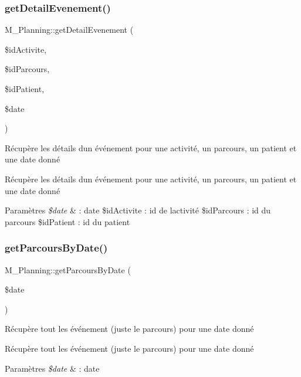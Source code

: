 \subsubsection{\texorpdfstring{get\+Detail\+Evenement()}{getDetailEvenement()}}
{\footnotesize\ttfamily M\+\_\+\+Planning\+::get\+Detail\+Evenement (\begin{DoxyParamCaption}\item[{}]{\$id\+Activite,  }\item[{}]{\$id\+Parcours,  }\item[{}]{\$id\+Patient,  }\item[{}]{\$date }\end{DoxyParamCaption})}



Récupère les détails d\textquotesingle{}un événement pour une activité, un parcours, un patient et une date donné 

Récupère les détails d\textquotesingle{}un événement pour une activité, un parcours, un patient et une date donné 
\begin{DoxyParams}{Paramètres}
{\em \$date} & \+: date \$id\+Activite \+: id de l\textquotesingle{}activité \$id\+Parcours \+: id du parcours \$id\+Patient \+: id du patient \\
\hline
\end{DoxyParams}
\mbox{\label{class_m___planning_ac00607356a988cc322ac3353fc8f5134}} 
\subsubsection{\texorpdfstring{get\+Parcours\+By\+Date()}{getParcoursByDate()}}
{\footnotesize\ttfamily M\+\_\+\+Planning\+::get\+Parcours\+By\+Date (\begin{DoxyParamCaption}\item[{}]{\$date }\end{DoxyParamCaption})}



Récupère tout les événement (juste le parcours) pour une date donné 

Récupère tout les événement (juste le parcours) pour une date donné 
\begin{DoxyParams}{Paramètres}
{\em \$date} & \+: date \\
\hline
\end{DoxyParams}
\mbox{\label{class_m___planning_a6a9b1fa1202b0171f8ceb3e69717e2bb}} 
